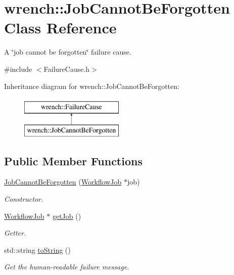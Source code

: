 \hypertarget{classwrench_1_1_job_cannot_be_forgotten}{}\section{wrench\+:\+:Job\+Cannot\+Be\+Forgotten Class Reference}
\label{classwrench_1_1_job_cannot_be_forgotten}


A \char`\"{}job cannot be forgotten\char`\"{} failure cause.  




{\ttfamily \#include $<$Failure\+Cause.\+h$>$}

Inheritance diagram for wrench\+:\+:Job\+Cannot\+Be\+Forgotten\+:\begin{figure}[H]
\begin{center}
\leavevmode
\includegraphics[height=2.000000cm]{classwrench_1_1_job_cannot_be_forgotten}
\end{center}
\end{figure}
\subsection*{Public Member Functions}
\begin{DoxyCompactItemize}
\item 
\hyperlink{classwrench_1_1_job_cannot_be_forgotten_aa36377ad34fc84b23ae3fe518db538fa}{Job\+Cannot\+Be\+Forgotten} (\hyperlink{classwrench_1_1_workflow_job}{Workflow\+Job} $\ast$job)
\begin{DoxyCompactList}\small\item\em Constructor. \end{DoxyCompactList}\item 
\hyperlink{classwrench_1_1_workflow_job}{Workflow\+Job} $\ast$ \hyperlink{classwrench_1_1_job_cannot_be_forgotten_ae21aa5adc48ff0998d9fefc7f2c4c9f9}{get\+Job} ()
\begin{DoxyCompactList}\small\item\em Getter. \end{DoxyCompactList}\item 
std\+::string \hyperlink{classwrench_1_1_job_cannot_be_forgotten_abbfbece144c738c9948bf8f01d6bbd53}{to\+String} ()
\begin{DoxyCompactList}\small\item\em Get the human-\/readable failure message. \end{DoxyCompactList}\end{DoxyCompactItemize}
